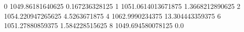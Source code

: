0 1049.86181640625 0.167236328125
1 1051.0614013671875 1.3668212890625
2 1054.220947265625 4.5263671875
4 1062.9990234375 13.304443359375
6 1051.27880859375 1.584228515625
8 1049.694580078125 0.0

